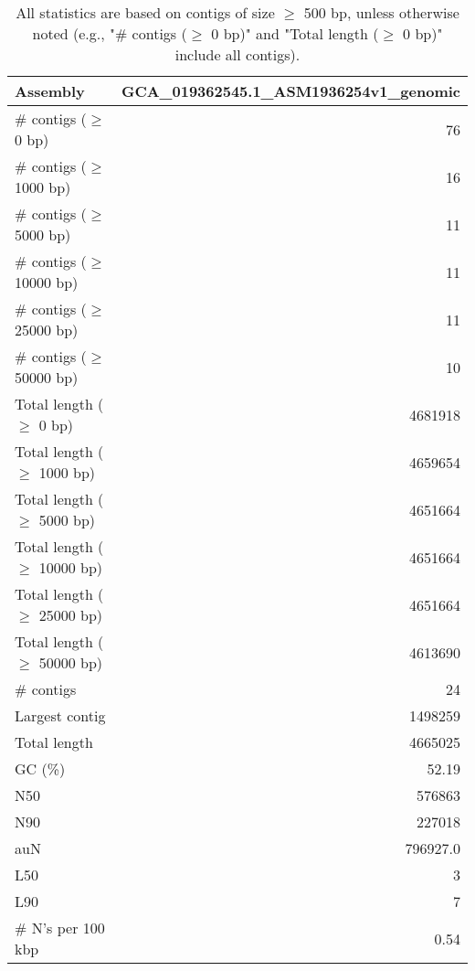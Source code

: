 \documentclass[12pt,a4paper]{article}
\begin{document}
\begin{table}[ht]
\begin{center}
\caption{All statistics are based on contigs of size $\geq$ 500 bp, unless otherwise noted (e.g., "\# contigs ($\geq$ 0 bp)" and "Total length ($\geq$ 0 bp)" include all contigs).}
\begin{tabular}{|l*{1}{|r}|}
\hline
Assembly & GCA\_019362545.1\_ASM1936254v1\_genomic \\ \hline
\# contigs ($\geq$ 0 bp) & 76 \\ \hline
\# contigs ($\geq$ 1000 bp) & 16 \\ \hline
\# contigs ($\geq$ 5000 bp) & 11 \\ \hline
\# contigs ($\geq$ 10000 bp) & 11 \\ \hline
\# contigs ($\geq$ 25000 bp) & 11 \\ \hline
\# contigs ($\geq$ 50000 bp) & 10 \\ \hline
Total length ($\geq$ 0 bp) & 4681918 \\ \hline
Total length ($\geq$ 1000 bp) & 4659654 \\ \hline
Total length ($\geq$ 5000 bp) & 4651664 \\ \hline
Total length ($\geq$ 10000 bp) & 4651664 \\ \hline
Total length ($\geq$ 25000 bp) & 4651664 \\ \hline
Total length ($\geq$ 50000 bp) & 4613690 \\ \hline
\# contigs & 24 \\ \hline
Largest contig & 1498259 \\ \hline
Total length & 4665025 \\ \hline
GC (\%) & 52.19 \\ \hline
N50 & 576863 \\ \hline
N90 & 227018 \\ \hline
auN & 796927.0 \\ \hline
L50 & 3 \\ \hline
L90 & 7 \\ \hline
\# N's per 100 kbp & 0.54 \\ \hline
\end{tabular}
\end{center}
\end{table}
\end{document}
